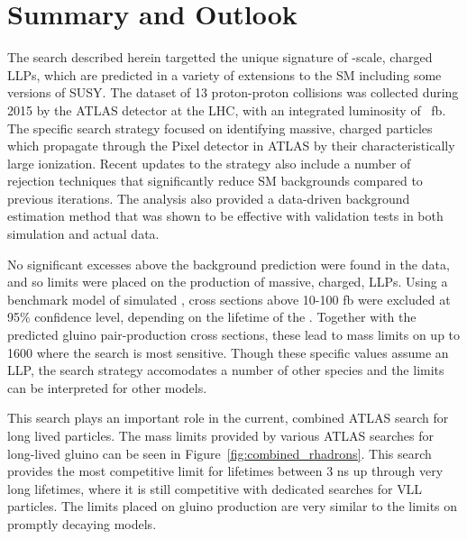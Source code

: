 \chapter{Summary and Outlook}

\label{ch:conclusion}

The search described herein targetted the unique signature of \TeV-scale, charged \acp{LLP}, which are predicted in a variety of extensions to the \ac{SM} including some versions of \ac{SUSY}.
The dataset of 13 \TeV proton-proton collisions was collected during 2015 by the ATLAS detector at the \ac{LHC}, with an integrated luminosity of \lumi~fb.
The specific search strategy focused on identifying massive, charged particles which propagate through the Pixel detector in ATLAS by their characteristically large ionization.
Recent updates to the strategy also include a number of rejection techniques that significantly reduce \ac{SM} backgrounds compared to previous iterations.
The analysis also provided a data-driven background estimation method that was shown to be effective with validation tests in both simulation and actual data.

No significant excesses above the background prediction were found in the data, and so limits were placed on the production of massive, charged, \acp{LLP}.
Using a benchmark model of simulated \rhadrons, cross sections above 10-100 fb were excluded at 95\% confidence level, depending on the lifetime of the \rhadron.
Together with the predicted gluino pair-production cross sections, these lead to mass limits on \rhadrons up to 1600 \GeV where the search is most sensitive.
Though these specific values assume an \rhadron \ac{LLP}, the search strategy accomodates a number of other species and the limits can be interpreted for other models.

This search plays an important role in the current, combined ATLAS search for long lived particles.
The mass limits provided by various ATLAS searches for long-lived gluino \rhadrons can be seen in Figure~\ref{fig:combined_rhadrons}.
This search provides the most competitive limit for lifetimes between 3 ns up through very long lifetimes, where it is still competitive with dedicated searches for \ac{VLL} particles.
The limits placed on gluino production are very similar to the limits on promptly decaying models.

